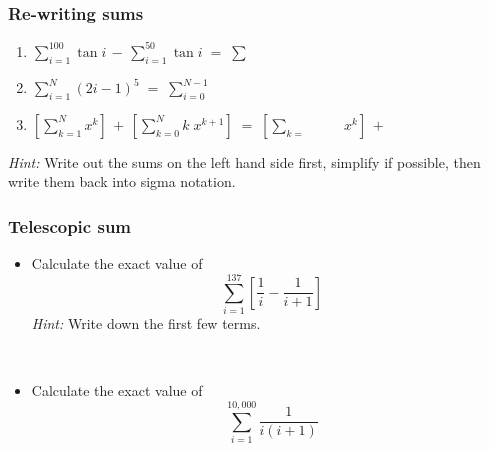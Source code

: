 \documentclass[14pt]{beamer}
\newcommand{\p}{\pause}
\newcommand{\setsize}[1]{\fontsize{#1}{#1}\selectfont} %
\newcommand{\smallerfont}{\setsize{13}} %
\newcommand{\aaa}{\boxed{\phantom{???}}}
\newcommand{\bbb}{\boxed{\phantom{?????^f_p}}}
\begin{document}
	\begin{frame}[t]
		\smallerfont
		\frametitle{Re-writing sums}

		\begin{enumerate}
			\item ${\displaystyle \sum_{i=1}^{100} \tan i \, - \, \sum_{i=1}^{50} \tan i \; = \; \sum_{\aaa}^{\aaa} \bbb }$
				\vfill

			\item ${\displaystyle \sum_{i=1}^{N} (2i-1)^5 \; = \; \sum_{i=0}^{N-1} \bbb }$
				\vfill

			\item ${\displaystyle  \left[ \sum_{k=1}^N x^k \right] \, + \, \left[ \sum_{k=0}^{N} k \; x^{k+1} \right] \; = \; \left[ \sum_{k=\aaa}^{\aaa} \!\!\aaa \,x^k \right] \, + \, \aaa }$
				\vfill
		\end{enumerate}

		\emph{Hint:} Write out the sums on the left hand side first, simplify if possible,
		then write them back into sigma notation.
	\end{frame}
	\begin{frame}[t]
		\frametitle{Telescopic sum}

		\begin{itemize}
			\item Calculate the exact value of
				\[
					\sum_{i=1}^{137}\left[ \frac{1}{i}- \frac{1}{i+1}\right]
				\]
				\emph{Hint:} Write down the first few terms.

				\p \


			\item Calculate the exact value of
				\[
					\sum_{i=1}^{10,000}\frac{1}{i(i+1)}
				\]
		\end{itemize}
	\end{frame}
\end{document}
